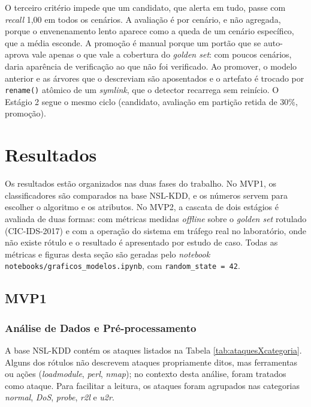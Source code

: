 \documentclass[a4paper,10pt, twocolumn]{article}
\begin{document}
O terceiro critério impede que um candidato, que alerta em tudo, passe
com \textit{recall} 1,00 em todos os cenários. A avaliação é por cenário, e não
agregada, porque o envenenamento lento aparece como a queda de um cenário
específico, que a média esconde. A promoção é manual porque um portão que se
auto-aprova vale apenas o que vale a cobertura do \textit{golden set}: com poucos
cenários, daria aparência de verificação ao que não foi verificado. Ao promover, o modelo anterior e as árvores que o descreviam são
aposentados e o artefato é trocado por \texttt{rename()} atômico de um \textit{symlink},
que o detector recarrega sem reinício. O Estágio 2 segue o mesmo ciclo
(candidato, avaliação em partição retida de 30\%, promoção).

\section{Resultados}
Os resultados estão organizados nas duas fases do trabalho. No MVP1, os
classificadores são comparados na base NSL-KDD, e os números servem para escolher o
algoritmo e os atributos. No MVP2, a cascata de dois estágios é avaliada de duas
formas: com métricas medidas \textit{offline} sobre o \textit{golden set} rotulado
(CIC-IDS-2017) e com a operação do sistema em tráfego real no laboratório, onde não
existe rótulo e o resultado é apresentado por estudo de caso. Todas as métricas e
figuras desta seção são geradas pelo \textit{notebook}
\texttt{notebooks/graficos\_modelos.ipynb}, com \texttt{random\_state = 42}.

\subsection{MVP1}

\subsubsection{Análise de Dados e Pré-processamento}
A base NSL-KDD contém os ataques listados na Tabela \ref{tab:ataquesXcategoria}.
Alguns dos rótulos não descrevem ataques propriamente ditos, mas ferramentas ou ações
(\textit{loadmodule}, \textit{perl}, \textit{nmap}); no contexto desta análise, foram
tratados como ataque. Para facilitar a leitura, os ataques foram agrupados nas
categorias \textit{normal}, \textit{DoS}, \textit{probe}, \textit{r2l} e \textit{u2r}.
\end{document}
